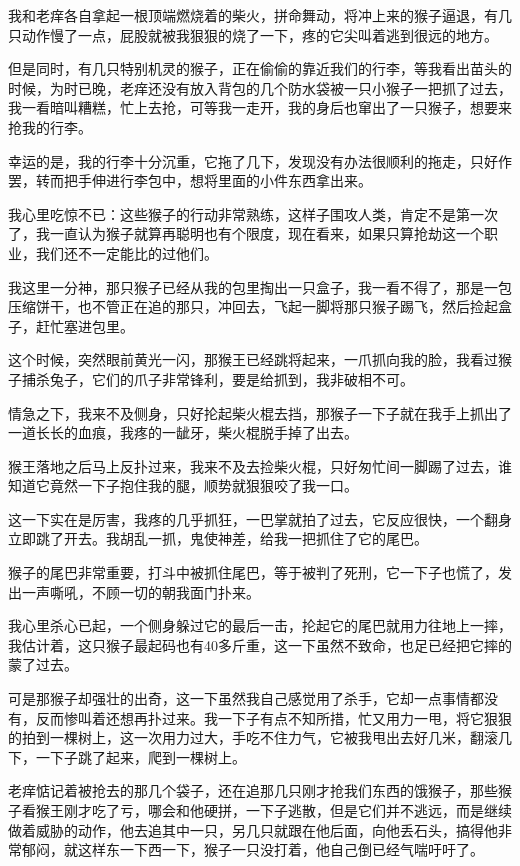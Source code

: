 我和老痒各自拿起一根顶端燃烧着的柴火，拼命舞动，将冲上来的猴子逼退，有几只动作慢了一点，屁股就被我狠狠的烧了一下，疼的它尖叫着逃到很远的地方。

但是同时，有几只特别机灵的猴子，正在偷偷的靠近我们的行李，等我看出苗头的时候，为时已晚，老痒还没有放入背包的几个防水袋被一只小猴子一把抓了过去，我一看暗叫糟糕，忙上去抢，可等我一走开，我的身后也窜出了一只猴子，想要来抢我的行李。

幸运的是，我的行李十分沉重，它拖了几下，发现没有办法很顺利的拖走，只好作罢，转而把手伸进行李包中，想将里面的小件东西拿出来。

我心里吃惊不已：这些猴子的行动非常熟练，这样子围攻人类，肯定不是第一次了，我一直认为猴子就算再聪明也有个限度，现在看来，如果只算抢劫这一个职业，我们还不一定能比的过他们。

我这里一分神，那只猴子已经从我的包里掏出一只盒子，我一看不得了，那是一包压缩饼干，也不管正在追的那只，冲回去，飞起一脚将那只猴子踢飞，然后捡起盒子，赶忙塞进包里。

这个时候，突然眼前黄光一闪，那猴王已经跳将起来，一爪抓向我的脸，我看过猴子捕杀兔子，它们的爪子非常锋利，要是给抓到，我非破相不可。

情急之下，我来不及侧身，只好抡起柴火棍去挡，那猴子一下子就在我手上抓出了一道长长的血痕，我疼的一龇牙，柴火棍脱手掉了出去。

猴王落地之后马上反扑过来，我来不及去捡柴火棍，只好匆忙间一脚踢了过去，谁知道它竟然一下子抱住我的腿，顺势就狠狠咬了我一口。

这一下实在是厉害，我疼的几乎抓狂，一巴掌就拍了过去，它反应很快，一个翻身立即跳了开去。我胡乱一抓，鬼使神差，给我一把抓住了它的尾巴。

猴子的尾巴非常重要，打斗中被抓住尾巴，等于被判了死刑，它一下子也慌了，发出一声嘶吼，不顾一切的朝我面门扑来。

我心里杀心已起，一个侧身躲过它的最后一击，抡起它的尾巴就用力往地上一摔，我估计着，这只猴子最起码也有40多斤重，这一下虽然不致命，也足已经把它摔的蒙了过去。

可是那猴子却强壮的出奇，这一下虽然我自己感觉用了杀手，它却一点事情都没有，反而惨叫着还想再扑过来。我一下子有点不知所措，忙又用力一甩，将它狠狠的拍到一棵树上，这一次用力过大，手吃不住力气，它被我甩出去好几米，翻滚几下，一下子跳了起来，爬到一棵树上。

老痒惦记着被抢去的那几个袋子，还在追那几只刚才抢我们东西的饿猴子，那些猴子看猴王刚才吃了亏，哪会和他硬拼，一下子逃散，但是它们并不逃远，而是继续做着威胁的动作，他去追其中一只，另几只就跟在他后面，向他丢石头，搞得他非常郁闷，就这样东一下西一下，猴子一只没打着，他自己倒已经气喘吁吁了。

